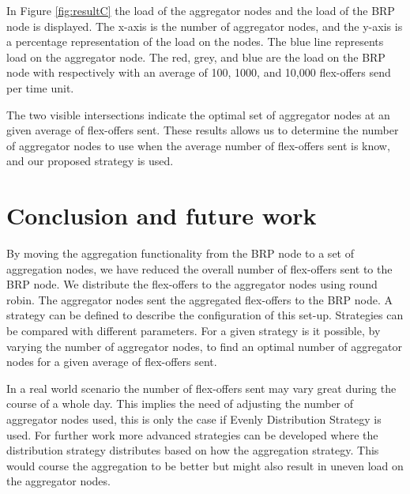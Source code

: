 \documentclass{ifacconf}
\begin{document}
In Figure \ref{fig:resultC} the load of the aggregator nodes and the load of the BRP node is displayed.
The x-axis is the number of aggregator nodes, and the y-axis is a percentage representation of the load on the nodes.
The blue line represents load on the aggregator node.
The red, grey, and blue are the load on the BRP node with respectively with an average of 100, 1000, and 10,000 flex-offers send per time unit.

The two visible intersections indicate the optimal set of aggregator nodes at an given average of flex-offers sent. 
These results allows us to determine the number of aggregator nodes to use when the average number of flex-offers sent is know, and our proposed strategy is used.   

\section{Conclusion and future work}
By moving the aggregation functionality from the BRP node to a set of aggregation nodes, we have reduced the overall number of flex-offers sent to the BRP node.
We distribute the flex-offers to the aggregator nodes using round robin.   
The aggregator nodes sent the aggregated flex-offers to the BRP node.
A strategy can be defined to describe the configuration of this set-up.
Strategies can be compared with different parameters. 
For a given strategy is it possible, by varying the number of aggregator nodes, to find an optimal number of aggregator nodes for a given average of flex-offers sent.


In a real world scenario the number of flex-offers sent may vary great during the course of a whole day. 
This implies the need of adjusting the number of aggregator nodes used, this is only the case if Evenly Distribution Strategy is used.
For further work more advanced strategies can be developed where the distribution strategy distributes based on how the aggregation strategy. 
This would course the aggregation to be better but might also result in uneven load on the aggregator nodes.  



\appendix
{}
\end{document}
